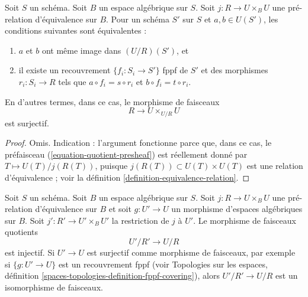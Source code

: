 \begin{lemma}
\label{lemma-quotient-pre-equivalence}
Soit $S$ un schéma. Soit $B$ un espace algébrique sur $S$. Soit $j : R \to U \times_B U$ une pré-relation d'équivalence sur $B$. Pour un schéma $S'$ sur $S$ et $a, b \in U(S')$, les conditions suivantes sont équivalentes :
\begin{enumerate}
\item $a$ et $b$ ont même image dans $(U/R)(S')$, et
\item il existe un recouvrement $\{f_i : S_i \to S'\}$ fppf de $S'$ et des morphismes $r_i : S_i \to R$ tels que $a \circ f_i = s \circ r_i$ et $b \circ f_i = t \circ r_i$.
\end{enumerate}
En d'autres termes, dans ce cas, le morphisme de faisceaux
$$
R \longrightarrow U \times_{U/R} U
$$
est surjectif.
\end{lemma}

\begin{proof}
Omis. Indication : l'argument fonctionne parce que, dans ce cas, le préfaisceau (\ref{equation-quotient-presheaf}) est réellement donné par $T \mapsto U(T)/j(R(T))$, puisque $j(R(T)) \subset U(T) \times U(T)$ est une relation d'équivalence ; voir la définition \ref{definition-equivalence-relation}.
\end{proof}

\begin{lemma}
\label{lemma-quotient-pre-equivalence-relation-restrict}
Soit $S$ un schéma. Soit $B$ un espace algébrique sur $S$. Soit $j : R \to U \times_B U$ une pré-relation d'équivalence sur $B$ et soit $g : U' \to U$ un morphisme d'espaces algébriques sur $B$. Soit $j' : R' \to U' \times_B U'$ la restriction de $j$ à $U'$. Le morphisme de faisceaux quotients
$$
U'/R' \longrightarrow U/R
$$
est injectif. Si $U' \to U$ est surjectif comme morphisme de faisceaux, par exemple si $\{g : U' \to U\}$ est un recouvrement fppf (voir Topologies sur les espaces, définition \ref{spaces-topologies-definition-fppf-covering}), alors $U'/R' \to U/R$ est un isomorphisme de faisceaux.
\end{lemma}

